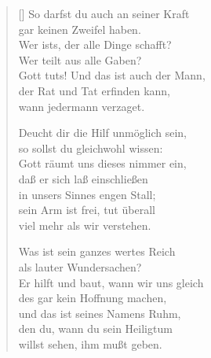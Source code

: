\begin{multicols}{2}
\begin{verse}[\versewidth]
 So darfst du auch an seiner Kraft\\
gar keinen Zweifel haben.\\
Wer ists, der alle Dinge schafft?\\
Wer teilt aus alle Gaben?\\
Gott tuts! Und das ist auch der Mann,\\
der Rat und Tat erfinden kann,\\
wann jedermann verzaget.

 Deucht dir die Hilf unmöglich sein,\\
so sollst du gleichwohl wissen:\\
Gott räumt uns dieses nimmer ein,\\
daß er sich laß einschließen\\
in unsers Sinnes engen Stall;\\
sein Arm ist frei, tut überall\\
viel mehr als wir verstehen.

 Was ist sein ganzes wertes Reich\\
als lauter Wundersachen?\\
Er hilft und baut, wann wir uns gleich\\
des gar kein Hoffnung machen,\\
und das ist seines Namens Ruhm,\\
den du, wann du sein Heiligtum\\
willst sehen, ihm mußt geben.

\end{verse}
\end{multicols}
